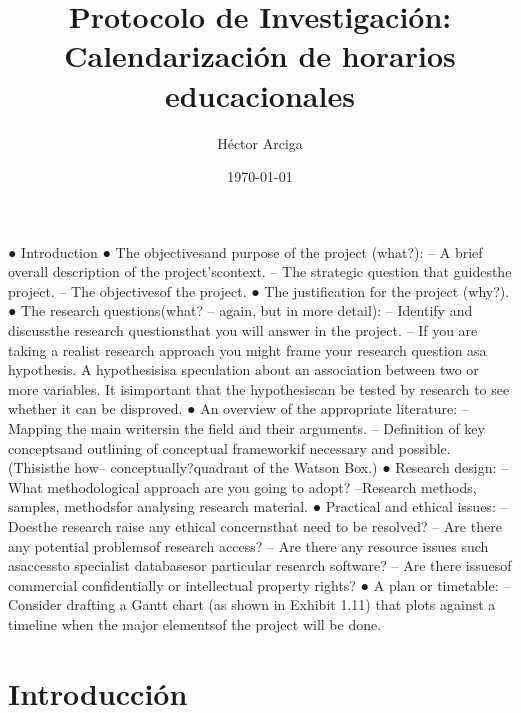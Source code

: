 \documentclass[draft,12pt,headsepline,footsepline,paper=letter]{scrreprt}
\begin{document}
\title{Protocolo de Investigación: Calendarización de horarios educacionales}
\author{Héctor Arciga}
\date{\today}

\maketitle

● Introduction
● The objectivesand purpose of the project (what?):
– A brief overall description of the project’scontext.
– The strategic question that guidesthe project.
– The objectivesof the project.
● The justification for the project (why?).
● The research questions(what? – again, but in more detail):
– Identify and discussthe research questionsthat you will answer in the
project.
– If you are taking a realist research approach you might frame your
research question asa hypothesis. A hypothesisisa speculation about
an association between two or more variables. It isimportant that the
hypothesiscan be tested by research to see whether it can be
disproved. 
● An overview of the appropriate literature:
– Mapping the main writersin the field and their arguments.
– Definition of key conceptsand outlining of conceptual frameworkif
necessary and possible. (Thisisthe how– conceptually?quadrant of
the Watson Box.)
● Research design:
– What methodological approach are you going to adopt?
–Research methods, samples, methodsfor analysing research material.
● Practical and ethical issues:
–Doesthe research raise any ethical concernsthat need to be resolved?
– Are there any potential problemsof research access?
– Are there any resource issues such asaccessto specialist databasesor
particular research software?
– Are there issuesof commercial confidentially or intellectual property
rights?
● A plan or timetable:
– Consider drafting a Gantt chart (as shown in Exhibit 1.11) that plots
against a timeline when the major elementsof the project will be done.

\section{Introducción}
\end{document}
